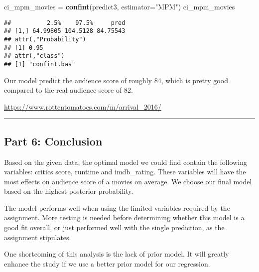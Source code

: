 \documentclass[]{article}
\newenvironment{Shaded}{\begin{snugshade}}{\end{snugshade}}
\newcommand{\KeywordTok}[1]{\textcolor[rgb]{0.13,0.29,0.53}{\textbf{#1}}}
\newcommand{\DataTypeTok}[1]{\textcolor[rgb]{0.13,0.29,0.53}{#1}}
\newcommand{\StringTok}[1]{\textcolor[rgb]{0.31,0.60,0.02}{#1}}
\newcommand{\NormalTok}[1]{#1}
\begin{document}
\begin{Shaded}
\begin{Highlighting}[]
\NormalTok{ci_mpm_movies =}\StringTok{ }\KeywordTok{confint}\NormalTok{(predict3, }\DataTypeTok{estimator=}\StringTok{"MPM"}\NormalTok{)}
\NormalTok{ci_mpm_movies}
\end{Highlighting}
\end{Shaded}

\begin{verbatim}
##          2.5%    97.5%     pred
## [1,] 64.99805 104.5128 84.75543
## attr(,"Probability")
## [1] 0.95
## attr(,"class")
## [1] "confint.bas"
\end{verbatim}

Our model predict the audience score of roughly 84, which is pretty good
compared to the real audience score of 82.

\url{https://www.rottentomatoes.com/m/arrival_2016/}

\begin{center}\rule{0.5\linewidth}{\linethickness}\end{center}

\subsection{Part 6: Conclusion}\label{part-6-conclusion}

Based on the given data, the optimal model we could find contain the
following variables: critics score, runtime and imdb\_rating. These
variables will have the most effects on audience score of a movies on
average. We choose our final model based on the highest posterior
probability.

The model performs well when using the limited variables required by the
assignment. More testing is needed before determining whether this model
is a good fit overall, or just performed well with the single
prediction, as the assignment stipulates.

One shortcoming of this analysis is the lack of prior model. It will
greatly enhance the study if we use a better prior model for our
regression.
\end{document}
